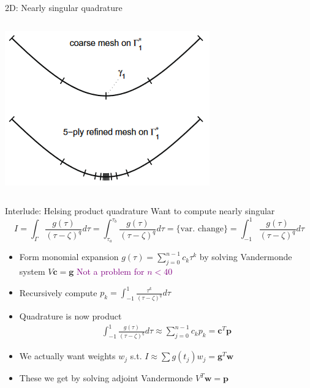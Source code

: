 \documentclass[t]{beamer}
\newcommand{\com}[1]{{\scriptsize \textcolor{purple}{#1}}}      %
\begin{document}
\begin{frame}{2D: Nearly singular quadrature}
\begin{center}
\begin{columns}[c]
\begin{column}{0.5\textwidth}
        \includegraphics[width=\textwidth]{fig/refinement}        
      \end{column}
    \end{columns}
  \end{center}  
\end{frame}

\begin{noframe}{Interlude: Helsing product quadrature}
  Want to compute nearly singular
  $$
  I = \int_\Gamma \frac{g(\tau)}{(\tau-\zeta)^q} d\tau
  =
  \int_{\tau_a}^{\tau_b} \frac{g(\tau)}{(\tau-\zeta)^q} d\tau
  = \text{\{var. change\}} = 
  \int_{-1}^{1} \frac{g(\tau)}{(\tau-\zeta)^q} d\tau
  $$
  \begin{itemize}
  \item Form monomial expansion
    $
    g(\tau) = \sum_{j=0}^{n-1} c_k \tau^k $
    by solving Vandermonde system $V\bm{c} = \bm g$ \hfill \com{Not a problem for $n < 40$}
  \item Recursively compute $p_k = \int_{-1}^{1} \frac{\tau^k}{(\tau-\zeta)^q} d\tau$
  \item Quadrature is now product
    \begin{align}
      \int_{-1}^{1} \frac{g(\tau)}{(\tau-\zeta)^q} d\tau \approx \sum_{j=0}^{n-1} c_k p_k = \bm{c}^T\bm{p} 
    \end{align}
  \item We actually want weights $w_j$ s.t. $I \approx \sum g(t_j) w_j = \bm{g}^T \bm{w}$
  \item These we get by solving adjoint Vandermonde $V^T\bm{w} = \bm p$
  \end{itemize}
  
  
\end{noframe}
\end{document}
